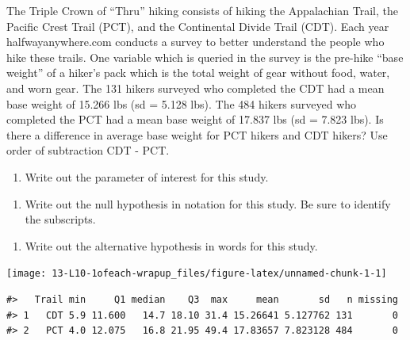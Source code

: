 \documentclass[
]{report}
\providecommand{\tightlist}{%
  \setlength{\itemsep}{0pt}\setlength{\parskip}{0pt}}
\begin{document}
The Triple Crown of ``Thru'' hiking consists of hiking the Appalachian Trail, the Pacific Crest Trail (PCT), and the Continental Divide Trail (CDT). Each year halfwayanywhere.com conducts a survey to better understand the people who hike these trails. One variable which is queried in the survey is the pre-hike ``base weight'' of a hiker's pack which is the total weight of gear without food, water, and worn gear. The 131 hikers surveyed who completed the CDT had a mean base weight of 15.266 lbs (sd = 5.128 lbs). The 484 hikers surveyed who completed the PCT had a mean base weight of 17.837 lbs (sd = 7.823 lbs). Is there a difference in average base weight for PCT hikers and CDT hikers? Use order of subtraction CDT - PCT.

\begin{enumerate}
\def\labelenumi{\arabic{enumi}.}
\tightlist
\item
  Write out the parameter of interest for this study.
\end{enumerate}

\vspace{0.8in}

\begin{enumerate}
\def\labelenumi{\arabic{enumi}.}
\setcounter{enumi}{1}
\tightlist
\item
  Write out the null hypothesis in notation for this study. Be sure to identify the subscripts.
\end{enumerate}

\vspace{0.5in}

\begin{enumerate}
\def\labelenumi{\arabic{enumi}.}
\setcounter{enumi}{2}
\tightlist
\item
  Write out the alternative hypothesis in words for this study.
\end{enumerate}

\vspace{0.8in}

\begin{center}\texttt{[image: 13-L10-1ofeach-wrapup\_files/figure-latex/unnamed-chunk-1-1]} \end{center}

\begin{verbatim}
#>   Trail min     Q1 median    Q3  max     mean       sd   n missing
#> 1   CDT 5.9 11.600   14.7 18.10 31.4 15.26641 5.127762 131       0
#> 2   PCT 4.0 12.075   16.8 21.95 49.4 17.83657 7.823128 484       0
\end{verbatim}
\end{document}
